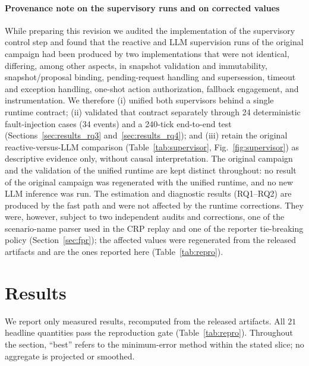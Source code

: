 \documentclass[smartcities,article,submit,moreauthors]{Definitions/mdpi}
\begin{document}
\paragraph{Provenance note on the supervisory runs and on corrected values}
While preparing this revision we audited the implementation of the
supervisory control step and found that the reactive and LLM supervision runs
of the original campaign had been produced by two implementations that were
not identical, differing, among other aspects, in snapshot validation and
immutability, snapshot/proposal binding, pending-request handling and
supersession, timeout and exception handling, one-shot action authorization,
fallback engagement, and instrumentation. We therefore (i) unified both
supervisors behind a single runtime contract; (ii) validated that contract
separately through 24 deterministic fault-injection cases (34 events) and a
240-tick end-to-end test (Sections~\ref{sec:results_rq3}
and~\ref{sec:results_rq4}); and (iii) retain the original
reactive-versus-LLM comparison (Table~\ref{tab:supervisor},
Fig.~\ref{fig:supervisor}) as descriptive evidence only, without causal
interpretation. The original campaign and the validation of the unified
runtime are kept distinct throughout: no result of the original campaign was
regenerated with the unified runtime, and no new LLM inference was run. The
estimation and diagnostic results (RQ1--RQ2) are produced by the fast path
and were not affected by the runtime corrections. They were, however, subject
to two independent audits and corrections, one of the scenario-name parser
used in the CRP replay and one of the reporter tie-breaking policy
(Section~\ref{sec:fpr}); the affected values were regenerated from the
released artifacts and are the ones reported here (Table~\ref{tab:repro}).




\section{Results}
\label{sec:results}

We report only measured results, recomputed from the released artifacts.
All $21$ headline quantities pass the reproduction gate
(Table~\ref{tab:repro}). Throughout the section, ``best'' refers to the
minimum-error method within the stated slice; no aggregate is projected or
smoothed.
\end{document}
